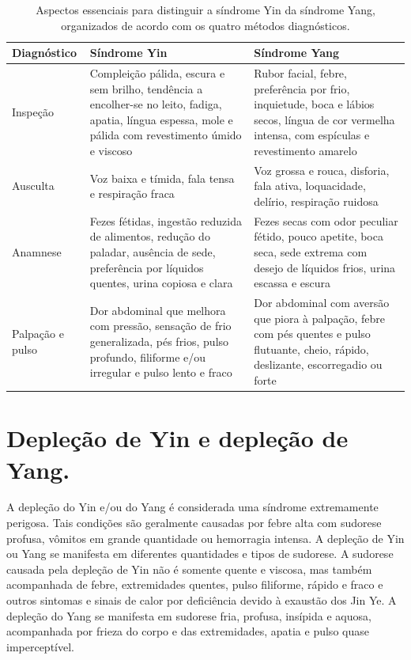 \documentclass[12pt,oneside,a4paper]{book} %
\begin{document}
\begin{table}[!htb]
	
	\centering
	{\renewcommand\arraystretch{5.0}
		\caption{Aspectos essenciais para distinguir a síndrome Yin da síndrome Yang, organizados de acordo com os quatro métodos diagnósticos.}}
	
		\begin{tabular}{l p{5.5cm} p{5.5cm}}
			
			\hline
			
			Diagnóstico &  
			Síndrome Yin &
			Síndrome Yang				
			\\ \hline \hline
			  
			Inspeção &
			Compleição pálida, escura e sem brilho, tendência a encolher-se no leito, fadiga, apatia, língua espessa, mole e pálida com revestimento úmido e viscoso &
			Rubor facial, febre, preferência por frio, inquietude, boca e lábios secos, língua de cor vermelha intensa, com espículas e revestimento amarelo
			\\  
			  
			Ausculta &
			Voz baixa e tímida, fala tensa e respiração fraca &
			Voz grossa e rouca, disforia, fala ativa, loquacidade, delírio, respiração ruidosa
			\\  
			  
			Anamnese &
			Fezes fétidas, ingestão reduzida de alimentos, redução do paladar, ausência de sede, preferência por líquidos quentes, urina copiosa e clara &
			Fezes secas com odor peculiar fétido, pouco apetite, boca seca, sede extrema com desejo de líquidos frios, urina escassa e escura
			\\  
			  
			Palpação e pulso &
			Dor abdominal que melhora com pressão, sensação de frio generalizada, pés frios, pulso profundo, filiforme e/ou irregular e pulso lento e fraco &
			Dor abdominal com aversão que piora à palpação, febre com pés quentes e pulso flutuante, cheio, rápido, deslizante, escorregadio ou forte
			\\  
			\hline
			
	\end{tabular} 
	
	
\end{table} 


\section{Depleção de Yin e depleção de Yang.}
A depleção do Yin e/ou do Yang é considerada uma síndrome extremamente perigosa. Tais condições são geralmente causadas por febre alta com sudorese profusa, vômitos em grande quantidade ou hemorragia intensa.
A depleção de Yin ou Yang se manifesta em diferentes quantidades e tipos de sudorese. A sudorese causada pela depleção de Yin não é somente quente e viscosa, mas também acompanhada de febre, extremidades quentes, pulso filiforme, rápido e fraco e outros sintomas e sinais de calor por deficiência devido à exaustão dos Jin Ye.
A depleção do Yang se manifesta em sudorese fria, profusa, insípida e aquosa, acompanhada por frieza do corpo e das extremidades, apatia e pulso quase imperceptível. 
\end{document}
